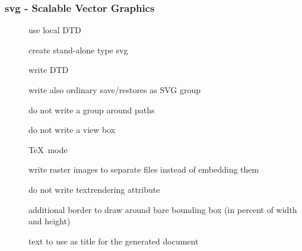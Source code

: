 \documentclass[english,a4paper]{article}
\begin{document}
\subsubsection{svg - Scalable Vector Graphics}
\begin{description}
\item[]
use local DTD


\item[]
create stand-alone type svg


\item[]
write DTD


\item[]
write also ordinary save/restores as SVG group


\item[]
do not write a group around paths


\item[]
do not write a view box


\item[]
\TeX\, mode


\item[]
write raster images to separate files instead of embedding them


\item[]
do not write textrendering attribute


\item[]
additional border to draw around bare bounding box (in percent of width and height)


\item[]
text to use as title for the generated document


\end{description}
\end{document}
